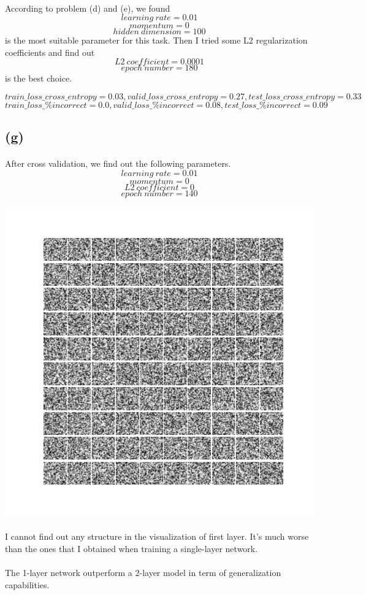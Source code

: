 \documentclass[twoside]{article}
\begin{document}
\paragraph{}According to problem (d) and (e), we found $$learning\ rate = 0.01$$ $$momentum = 0$$ $$hidden\ dimension = 100$$ is the most suitable parameter for this task. Then I tried some L2 regularization coefficients and find out $$L2\ coefficient = 0.0001$$  $$epoch\ number = 180$$is the best choice.

		$$train\_loss\_cross\_entropy =  0.03, valid\_loss\_cross\_entropy = 0.27,  test\_loss\_cross\_entropy = 0.33$$
		$$train\_loss\_\%incorrect = 0.0, valid\_loss\_\%incorrect = 0.08, test\_loss\_\%incorrect = 0.09$$

\subsection{(g)}
\paragraph{} After cross validation, we find out the following parameters.
$$learning\ rate = 0.01$$ $$momentum = 0$$
$$L2\ coefficient = 0 $$  $$epoch\ number = 140$$

\includegraphics[width=0.5\linewidth]{images/problem_g_visualization}
\paragraph{} I cannot find out any structure in the visualization of first layer. It's much worse than the ones that I obtained when training a single-layer network.
\paragraph{} The 1-layer network outperform a 2-layer model in term of generalization capabilities.
\end{document}

